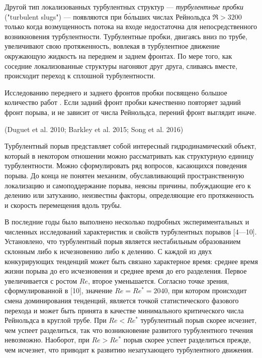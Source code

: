 Другой тип локализованных турбулентных структур --- {\it турбулентные пробки} ("turbulent slugs") --- появляются при б\'{о}льших числах Рейнольдса $\Re>3200$ только когда возмущенность потока на входе недостаточна для непосредственного возникновения турбулентности. Турбулентные пробки, двигаясь вниз по трубе, увеличивают свою протяженность, вовлекая в турбулентное движение окружающую жидкость на переднем и заднем фронтах. По мере того, как соседние локализованные структуры нагоняют друг друга, сливаясь вместе, происходит переход к сплошной турбулентности. 

Исследованию переднего и заднего фронтов пробки посвящено большое количество работ \cite{Lindgren1969, Wygnanski1973, Nishi2008, Duguet2010, Barkley2015}. Если задний фронт пробки качественно повторяет задний фронт порыва, и не зависит от числа Рейнольдса, перений фронт выглядит иначе. 

(Duguet et al. 2010; Barkley et al. 2015; Song et al. 2016)


Турбулентный порыв представляет собой интересный гидродинамический объект, который в некотором отношении можно рассматривать как структурную единицу турбулентности. Можно сформулировать ряд вопросов, касающихся поведения порыва. До конца не понятен механизм, обуславливающий пространственную локализацию и самоподдержание порыва, неясны причины, побуждающие его к делению или затуханию, неизвестны факторы, определяющие его протяженность и скорость перемещения вдоль трубы.

В последние годы было выполнено несколько подробных экспериментальных и численных исследований характеристик и свойств турбулентных порывов [4---10]. Установлено, что турбулентный порыв является нестабильным образованием склонным либо к исчезновению либо к делению. С каждой из двух конкурирующих тенденций может быть связано характерное время: среднее время жизни порыва до его исчезновения и среднее время до его разделения. Первое увеличивается с ростом $Re$, второе уменьшается. Согласно точке зрения, сформулированной в [10], значение $Re=Re^*=2040$, при котором происходит смена доминирования тенденций, является точкой статистического фазового перехода и может быть принята в качестве минимального критического числа Рейнольдса в круглой трубе. При $Re<Re^*$ турбулентный порыв скорее исчезнет, чем успеет разделиться, так что возникновение развитого турбулентного течения невозможно. Наоборот, при $Re>Re^*$ порыв скорее успеет разделиться прежде, чем исчезнет, что приводит к развитию незатухающего турбулентного движения.






